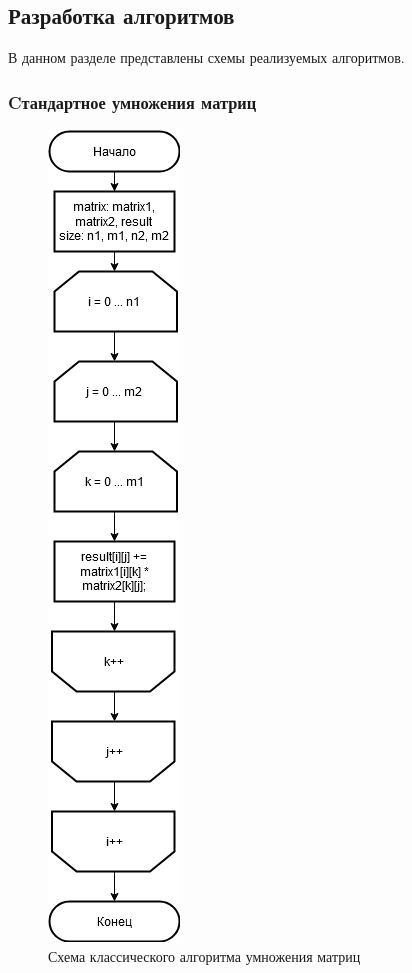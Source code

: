 \documentclass[12pt,a4paper]{article}
\begin{document}
\subsection{Разработка алгоритмов} %
В данном разделе представлены схемы реализуемых алгоритмов.
\subsubsection{Cтандартное умножения матриц}
\begin{figure}[!htbp]
\centering
\includegraphics[scale=0.7]{standart}
\caption{Схема классического алгоритма умножения матриц}
\label{fig:mpr}
\end{figure}
\clearpage
\end{document}
